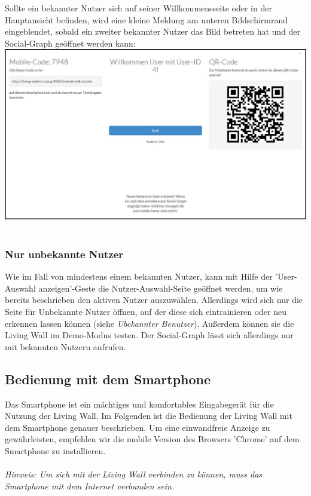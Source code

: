 \documentclass[10pt,a4paper]{report}
\begin{document}
		Sollte ein bekannter Nutzer sich auf seiner Willkommensseite oder in der Hauptansicht befinden, wird eine kleine Meldung am unteren Bildschirmrand eingeblendet, sobald ein zweiter bekannter Nutzer das Bild betreten hat und der Social-Graph geöffnet werden kann:\\
		\includegraphics[width=\linewidth]{NewUser}\\\\
		\subsubsection{Nur unbekannte Nutzer}
		Wie im Fall von mindestens einem bekannten Nutzer, kann mit Hilfe der 'User-Auswahl anzeigen'-Geste die Nutzer-Auswahl-Seite geöffnet werden, um wie bereits beschrieben den aktiven Nutzer auszuwählen. Allerdings wird sich nur die Seite für Unbekannte Nutzer öffnen, auf der diese sich eintrainieren oder neu erkennen lassen können (siehe \textit{Ubekannter Benutzer}). Außerdem können sie die Living Wall im Demo-Modus testen. Der Social-Graph lässt sich allerdings nur mit bekannten Nutzern aufrufen.

		\subsection{Bedienung mit dem Smartphone}
		Das Smartphone ist ein mächtiges und komfortables Eingabegerät für die Nutzung der Living Wall. Im Folgenden ist die Bedienung der Living Wall mit dem Smartphone genauer beschrieben. Um eine einwandfreie Anzeige zu gewährleisten, empfehlen wir die mobile Version des Browsers 'Chrome' auf dem Smartphone zu installieren.\\ \\
		\textit{Hinweis: Um sich mit der Living Wall verbinden zu können, muss das Smartphone mit dem Internet verbunden sein.}
\end{document}
